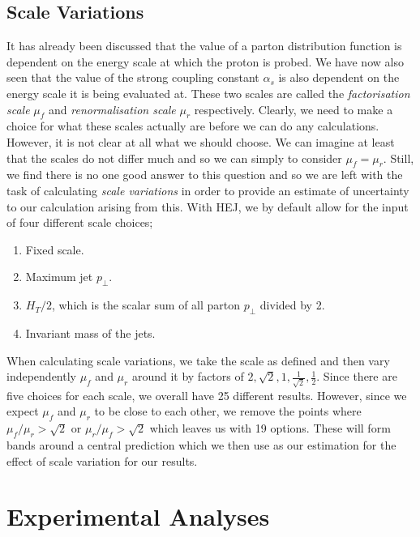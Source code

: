 \subsection{Scale Variations}

It has already been discussed that the value of a parton distribution function is dependent on the energy scale at which the proton is probed. We have now also seen that the value of the strong coupling constant $\alpha_s$ is also dependent on the energy scale it is being evaluated at. These two scales are called the \emph{factorisation scale} $\mu_f$ and \emph{renormalisation scale} $\mu_r$ respectively. Clearly, we need to make a choice for what these scales actually are before we can do any calculations. However, it is not clear at all what we should choose. We can imagine at least that the scales do not differ much and so we can simply to consider $\mu_f = \mu_r$. Still, we find there is no one good answer to this question and so we are left with the task of calculating \emph{scale variations} in order to provide an estimate of uncertainty to our calculation arising from this. With HEJ, we by default allow for the input of four different scale choices; 

\begin{enumerate}
\item{Fixed scale.}
\item{Maximum jet $p_\perp$.}
\item{$H_T/2$, which is the scalar sum of all parton $p_\perp$ divided by 2.}
\item{Invariant mass of the jets.}
\end{enumerate} 

When calculating scale variations, we take the scale as defined and then vary independently $\mu_f$ and $\mu_r$ around it by factors of $2, \sqrt{2}, 1, \frac{1}{\sqrt{2}}, \frac{1}{2}$. Since there are five choices for each scale, we overall have 25 different results. However, since we expect $\mu_f$ and $\mu_r$ to be close to each other, we remove the points where $\mu_f/\mu_r > \sqrt{2}$ or $\mu_r/\mu_f > \sqrt{2}$ which leaves us with 19 options. These will form bands around a central prediction which we then use as our estimation for the effect of scale variation for our results. %

\section{Experimental Analyses}

